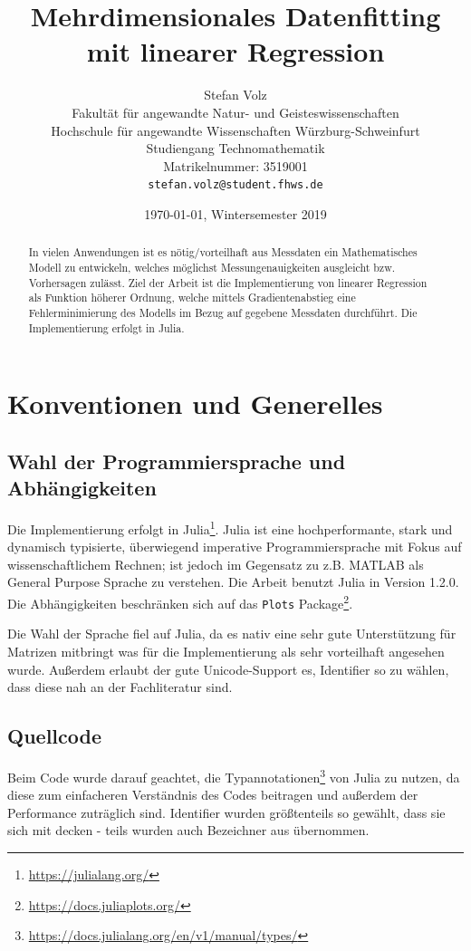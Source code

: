\documentclass{article}
\title{ Mehrdimensionales Datenfitting mit linearer Regression }
\author{
  Stefan Volz\\
  Fakultät für angewandte Natur- und Geisteswissenschaften\\
  Hochschule für angewandte Wissenschaften Würzburg-Schweinfurt\\
  Studiengang Technomathematik\\
  Matrikelnummer: 3519001\\
  \texttt{stefan.volz@student.fhws.de}\\
}
\date{\today, Wintersemester 2019}
\theoremstyle{plain} %
\theoremstyle{definition} %
\begin{document}
\maketitle

\begin{abstract}
  In vielen Anwendungen ist es nötig/vorteilhaft aus Messdaten ein Mathematisches Modell zu entwickeln, welches möglichst Messungenauigkeiten ausgleicht bzw. Vorhersagen zulässt. Ziel der Arbeit ist die Implementierung von linearer Regression als Funktion höherer Ordnung, welche mittels Gradientenabstieg eine Fehlerminimierung des Modells im Bezug auf gegebene Messdaten durchführt. Die Implementierung erfolgt in Julia.
\end{abstract}

\tableofcontents
\newpage

\section{Konventionen und Generelles}
\subsection{Wahl der Programmiersprache und Abhängigkeiten}
Die Implementierung erfolgt in Julia\footnote{\url{https://julialang.org/}}. Julia ist eine hochperformante, stark und dynamisch typisierte, überwiegend imperative Programmiersprache mit Fokus auf wissenschaftlichem Rechnen; ist jedoch im Gegensatz zu z.B. MATLAB als General Purpose Sprache zu verstehen. Die Arbeit benutzt Julia in Version 1.2.0. Die Abhängigkeiten beschränken sich auf das \texttt{Plots} Package\footnote{\url{https://docs.juliaplots.org/}}.

Die Wahl der Sprache fiel auf Julia, da es nativ eine sehr gute Unterstützung für Matrizen mitbringt was für die Implementierung als sehr vorteilhaft angesehen wurde. Außerdem erlaubt der gute Unicode-Support es, Identifier so zu wählen, dass diese nah an der Fachliteratur sind.

\subsection{Quellcode}
Beim Code wurde darauf geachtet, die Typannotationen\footnote{\url{https://docs.julialang.org/en/v1/manual/types/}} von Julia zu nutzen, da diese zum einfacheren Verständnis des Codes beitragen und außerdem der Performance zuträglich sind.
Identifier wurden größtenteils so gewählt, dass sie sich mit \cite{Bishop} decken - teils wurden auch Bezeichner aus \cite{Lippe} übernommen.
\end{document}
